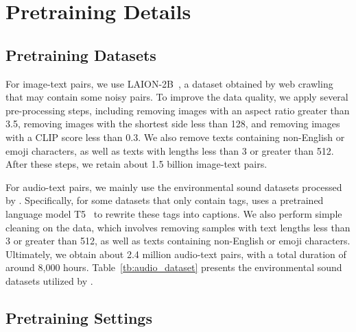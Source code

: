 \section{Pretraining Details}

\subsection{Pretraining Datasets}
\label{app:audio_text_data_details}
For image-text pairs, we use LAION-2B~\cite{laion5b}, a dataset obtained by web crawling that may contain some noisy pairs. 
To improve the data quality, we apply several pre-processing steps, including removing images with an aspect ratio greater than 3.5, removing images with the shortest side less than 128, and removing images with a CLIP score less than 0.3. We also remove texts containing non-English or emoji characters, as well as texts with lengths less than 3 or greater than 512. 
After these steps, we retain about 1.5 billion image-text pairs.

For audio-text pairs, we mainly use the environmental sound datasets processed by \cite{laion_clap}. Specifically, for some datasets that only contain tags, \cite{laion_clap} uses a pretrained language model T5~\cite{T5} to rewrite these tags into captions.
We also perform simple cleaning on the data, which involves removing samples with text lengths less than 3 or greater than 512, as well as texts containing non-English or emoji characters. 
Ultimately, we obtain about 2.4 million audio-text pairs, with a total duration of around 8,000 hours.
Table~\ref{tb:audio_dataset} presents the environmental sound datasets utilized by \onepeace.



\subsection{Pretraining Settings}
\label{app:pretraining_hyperparameters}


